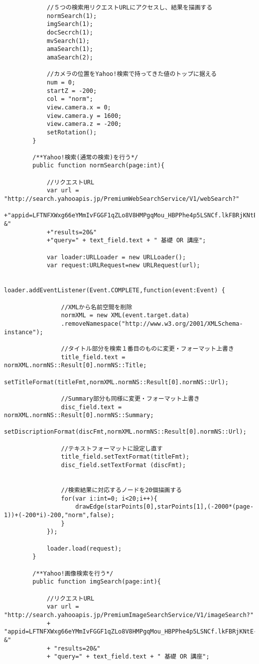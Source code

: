 {\begin{verbatim}
			//５つの検索用リクエストURLにアクセスし、結果を描画する
			normSearch(1);
			imgSearch(1);
			docSecrch(1);
			mvSearch(1);
			amaSearch(1);
			amaSearch(2);
			
			//カメラの位置をYahoo!検索で持ってきた値のトップに据える
			num = 0;
			startZ = -200;
			col = "norm";
			view.camera.x = 0;
			view.camera.y = 1600;
			view.camera.z = -200;
			setRotation();
		}
		
		/**Yahoo!検索(通常の検索)を行う*/
		public function normSearch(page:int){
			
			//リクエストURL
			var url = "http://search.yahooapis.jp/PremiumWebSearchService/V1/webSearch?"
			+"appid=LFTNFXWxg66eYMmIvFGGF1qZLo8V8HMPgqMou_HBPPhe4p5LSNCf.lkFBRjKNtE-&"
			+"results=20&"
			+"query=" + text_field.text + " 基礎 OR 講座";
			
			var loader:URLLoader = new URLLoader();
			var request:URLRequest=new URLRequest(url);

			loader.addEventListener(Event.COMPLETE,function(event:Event) {
									
				//XMLから名前空間を削除
				normXML = new XML(event.target.data)
				.removeNamespace("http://www.w3.org/2001/XMLSchema-instance");
				
				//タイトル部分を検索１番目のものに変更・フォーマット上書き
				title_field.text = normXML.normNS::Result[0].normNS::Title;
				setTitleFormat(titleFmt,normXML.normNS::Result[0].normNS::Url);
				
				//Summary部分も同様に変更・フォーマット上書き
				disc_field.text = normXML.normNS::Result[0].normNS::Summary;
				setDiscriptionFormat(discFmt,normXML.normNS::Result[0].normNS::Url);
				
				//テキストフォーマットに設定し直す
				title_field.setTextFormat(titleFmt);
				disc_field.setTextFormat (discFmt);
				
				
				//検索結果に対応するノードを20個描画する
				for(var i:int=0; i<20;i++){
					drawEdge(starPoints[0],starPoints[1],(-2000*(page-1))+(-200*i)-200,"norm",false);
				}
			});

			loader.load(request);
		}
		
		/**Yahoo!画像検索を行う*/
		public function imgSearch(page:int){
			
			//リクエストURL
			var url = "http://search.yahooapis.jp/PremiumImageSearchService/V1/imageSearch?"
			+ "appid=LFTNFXWxg66eYMmIvFGGF1qZLo8V8HMPgqMou_HBPPhe4p5LSNCf.lkFBRjKNtE-&"
			+ "results=20&"
			+ "query=" + text_field.text + " 基礎 OR 講座";
			

\end{verbatim}}

